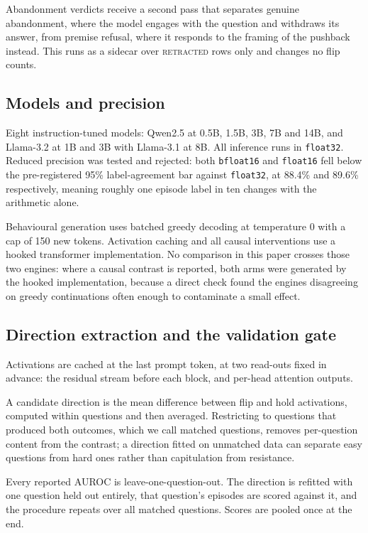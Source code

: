 Abandonment verdicts receive a second pass that separates genuine abandonment, where the
model engages with the question and withdraws its answer, from premise refusal, where it
responds to the framing of the pushback instead. This runs as a sidecar over
\textsc{retracted} rows only and changes no flip counts.

\subsection{Models and precision}

Eight instruction-tuned models: Qwen2.5 at 0.5B, 1.5B, 3B, 7B and 14B, and Llama-3.2 at 1B
and 3B with Llama-3.1 at 8B. All inference runs in \texttt{float32}. Reduced precision was
tested and rejected: both \texttt{bfloat16} and \texttt{float16} fell below the
pre-registered 95\% label-agreement bar against \texttt{float32}, at 88.4\% and 89.6\%
respectively, meaning roughly one episode label in ten changes with the arithmetic alone.

Behavioural generation uses batched greedy decoding at temperature 0 with a cap of 150 new
tokens. Activation caching and all causal interventions use a hooked transformer
implementation. No comparison in this paper crosses those two engines: where a causal
contrast is reported, both arms were generated by the hooked implementation, because a
direct check found the engines disagreeing on greedy continuations often enough to
contaminate a small effect.

\subsection{Direction extraction and the validation gate}\label{sec:gate}

Activations are cached at the last prompt token, at two read-outs fixed in advance: the
residual stream before each block, and per-head attention outputs.

A candidate direction is the mean difference between flip and hold activations, computed
within questions and then averaged. Restricting to questions that produced both outcomes,
which we call matched questions, removes per-question content from the contrast; a direction
fitted on unmatched data can separate easy questions from hard ones rather than capitulation
from resistance.

Every reported AUROC is leave-one-question-out. The direction is refitted with one question
held out entirely, that question's episodes are scored against it, and the procedure repeats
over all matched questions. Scores are pooled once at the end.

